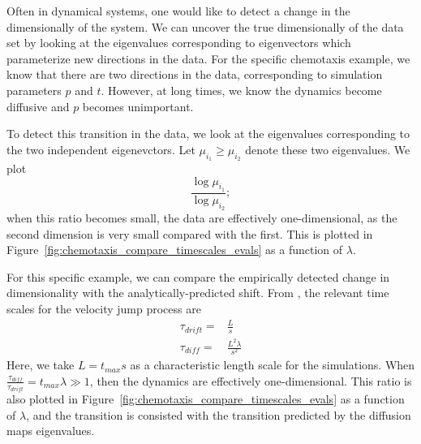 \documentclass[preprint]{elsarticle}
\begin{document}
Often in dynamical systems, one would like to detect a change in the dimensionally of the system. 
%
We can uncover the true dimensionally of the data set by looking at the eigenvalues corresponding to eigenvectors which parameterize new directions in the data. 
%
For the specific chemotaxis example, we know that there are two directions in the data, corresponding to simulation parameters $p$ and $t$. 
%
However, at long times, we know the dynamics become diffusive and $p$ becomes unimportant. 

To detect this transition in the data, we look at the eigenvalues corresponding to the two independent eigenevctors. 
%
Let $\mu_{i_1} \ge \mu_{i_2}$ denote these two eigenvalues. 
%
We plot  
\begin{equation}
 \frac{\log \mu_{i_1}}{\log \mu_{i_2}} ;
\end{equation}
when this ratio becomes small, the data are effectively one-dimensional, as the second dimension is very small compared with the first. 
%
This is plotted in Figure~\ref{fig:chemotaxis_compare_timescales_evals} as a function of $\lambda$. 

For this specific example, we can compare the empirically detected change in dimensionality with the analytically-predicted shift. 
%
From \cite{...}, the relevant time scales for the velocity jump process are
\begin{equation}
\begin{aligned}
\tau_{drift} =& \frac{L}{s} \\
\tau_{diff} =& \frac{L^2 \lambda}{s^2}
\end{aligned}
\end{equation}
%
Here, we take $L = t_{max} s$ as a characteristic length scale for the simulations. 
%
When $\frac{\tau_{diff}}{\tau_{drift}} =  t_{max}  \lambda \gg 1$, then the dynamics are effectively one-dimensional. 
%
This ratio is also plotted in Figure~\ref{fig:chemotaxis_compare_timescales_evals} as a function of $\lambda$, and the transition is consisted with the transition predicted by the diffusion maps eigenvalues. 
\end{document}
